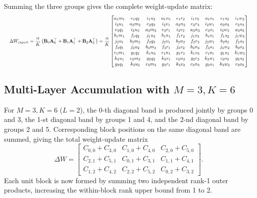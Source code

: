 \documentclass[a4paper,11pt]{article}
\newcommand{\DeltaW}{\Delta W}
\begin{document}
Summing the three groups gives the complete weight-update matrix:
\[
\resizebox{\linewidth}{!}{$\displaystyle
\Delta W_{\text{expert}}
= \frac{\alpha}{K}\left(\mathbf{B}_0 \mathbf{A}_0^\top+\mathbf{B}_1 \mathbf{A}_1^\top+\mathbf{B}_2 \mathbf{A}_2^\top\right)
= \frac{\alpha}{K}
\begin{bmatrix}
a_1 m_1 & e_1 q_2 & i_1 u_3 & a_1 n_1 & e_1 r_2 & i_1 v_3 & a_1 o_1 & e_1 s_2 & i_1 w_3 \\
i_2 u_1 & a_2 m_2 & e_2 q_3 & i_2 v_1 & a_2 n_2 & e_2 r_3 & i_2 w_1 & a_2 o_2 & e_2 s_3 \\
e_3 q_1 & i_3 u_2 & a_3 m_3 & e_3 r_1 & i_3 v_2 & a_3 n_3 & e_3 s_1 & i_3 w_2 & a_3 o_3 \\
b_1 m_1 & f_1 q_2 & j_1 u_3 & b_1 n_1 & f_1 r_2 & j_1 v_3 & b_1 o_1 & f_1 s_2 & j_1 w_3 \\
j_2 u_1 & b_2 m_2 & f_2 q_3 & j_2 v_1 & b_2 n_2 & f_2 r_3 & j_2 w_1 & b_2 o_2 & f_2 s_3 \\
f_3 q_1 & j_3 u_2 & b_3 m_3 & f_3 r_1 & j_3 v_2 & b_3 n_3 & f_3 s_1 & j_3 w_2 & b_3 o_3 \\
c_1 m_1 & g_1 q_2 & k_1 u_3 & c_1 n_1 & g_1 r_2 & k_1 v_3 & c_1 o_1 & g_1 s_2 & k_1 w_3 \\
k_2 u_1 & c_2 m_2 & g_2 q_3 & k_2 v_1 & c_2 n_2 & g_2 r_3 & k_2 w_1 & c_2 o_2 & g_2 s_3 \\
g_3 q_1 & k_3 u_2 & c_3 m_3 & g_3 r_1 & k_3 v_2 & c_3 n_3 & g_3 s_1 & k_3 w_2 & c_3 o_3
\end{bmatrix}
$}
\]

\subsection{\texorpdfstring{Multi-Layer Accumulation with $M=3,K=6$}{Multi-Layer Accumulation with M=3,K=6}}
\label{app:m3k6}

For $M=3,K=6$ ($L=2$), the 0-th diagonal band is produced jointly by groups 0 and 3, the 1-st diagonal band by groups 1 and 4, and the 2-nd diagonal band by groups 2 and 5. Corresponding block positions on the same diagonal band are summed, giving the total weight-update matrix
\begin{equation}
\DeltaW=
\begin{bmatrix}
C_{0,0}+C_{3,0} & C_{1,0}+C_{4,0} & C_{2,0}+C_{5,0}\\
C_{2,1}+C_{5,1} & C_{0,1}+C_{3,1} & C_{1,1}+C_{4,1}\\
C_{1,2}+C_{4,2} & C_{2,2}+C_{5,2} & C_{0,2}+C_{3,2}
\end{bmatrix}.
\end{equation}
Each unit block is now formed by summing two independent rank-1 outer products, increasing the within-block rank upper bound from 1 to 2.
\end{document}
